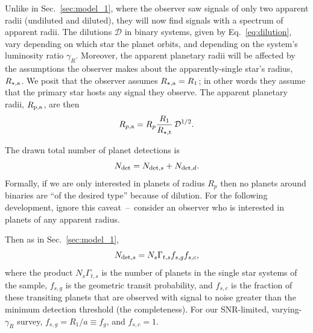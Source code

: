\documentclass{emulateapj}
\begin{document}
Unlike in Sec.~\ref{sec:model_1}, where the observer saw signals of only two 
apparent radii (undiluted and diluted), they will now find signals with a 
spectrum of apparent radii.
The dilutions $\mathcal{D}$ in binary systems, given by Eq.~\ref{eq:dilution}, 
vary depending on which star the planet orbits, and depending on the system's 
luminosity ratio $\gamma_R$.
Moreover, the apparent planetary radii will be affected by the assumptions the 
observer makes about the apparently-single star's radius, $R_{\star,{\rm a}}$.
We posit that the observer assumes $R_{\star,{\rm a}} = R_1$; in other words 
they assume that the primary star hosts any signal they observe.
The apparent planetary radii, $R_{\rm p, a}$, are then
\begin{equation}
R_{p,{\rm a}} = R_p 
\frac{R_1}
{R_{\star,{\rm t}}}
\,\mathcal{D}^{1/2}.
\end{equation}

The drawn total number of planet detections is 
\begin{equation}
N_{\rm det} = 
N_{{\rm det},s} 
+ 
N_{{\rm det},d}.
\end{equation}
Formally, if we are only interested in planets of radius $R_p$ then no planets 
around binaries are ``of the desired type'' because of dilution.
For the following development, ignore this caveat~--~consider an 
observer who is interested in planets of any apparent radius.

Then as in Sec.~\ref{sec:model_1},
\begin{equation}
N_{{\rm det},s} = N_s \Gamma_{t,s} f_{s,g} f_{s,c},
\label{eq:N_det_s_model2}
\end{equation}
where the product $N_s \Gamma_{t,s}$ is the number of planets in the single 
star systems of the sample, $f_{s,g}$ is the geometric transit probability, 
and $f_{s,c}$ is the fraction of these transiting planets that are observed 
with signal to noise greater than the minimum detection threshold (the 
completeness). 
For our SNR-limited, varying-$\gamma_R$ survey, $f_{s,g} = R_1/a\equiv f_g$, 
and $f_{s,c}=1$.
\end{document}
